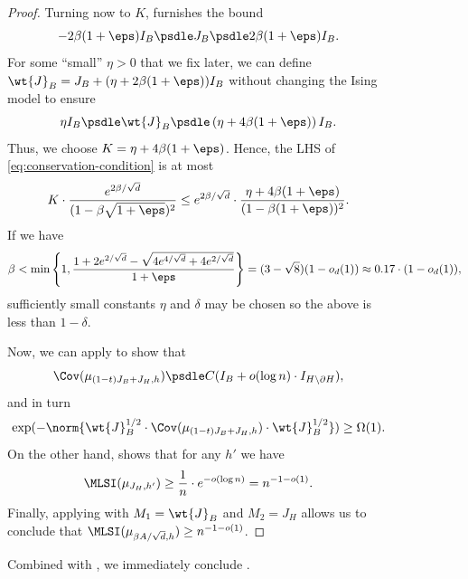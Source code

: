 \documentclass[11pt,letterpaper]{article}
\begin{document}
\begin{figure}
\begin{proof}
        Turning now to $K$,  furnishes the bound
        \[
            -2\beta(1+\eps) I_B \psdle J_B \psdle 2\beta(1+\eps) I_B.
        \]
        For some ``small'' $\eta > 0$ that we fix later, we can define $\wt{J}_B = J_B + (\eta + 2\beta(1+\eps))I_B$ without changing the Ising model to ensure
        \[
            \eta I_B \psdle \wt{J}_B \psdle \left(\eta + 4\beta(1+\eps)\right) I_B.
        \] 
        Thus, we choose $K = \eta + 4\beta(1+\eps)$. Hence, the LHS of \eqref{eq:conservation-condition} is at most
        \begin{align*}
            K \cdot \frac{e^{2\beta/\sqrt{d}}}{(1-\beta\sqrt{1+\eps})^2} \le e^{2\beta/\sqrt{d}} \cdot \frac{\eta + 4\beta(1+\eps)}{(1-\beta(1+\eps))^2}.
        \end{align*}
        If we have
        \begin{align*}
            \beta < \min\left\{ 1 , \frac{1+2e^{2/\sqrt{d}} - \sqrt{4e^{4/\sqrt{d}} + 4e^{2/\sqrt{d}}}}{1+\eps} \right\} = (3-\sqrt{8})(1 - o_d(1)) \approx 0.17 \cdot (1-o_d(1)),
        \end{align*}
        sufficiently small constants $\eta$ and $\delta$ may be chosen so the above is less than $1-\delta$.
    
        Now, we can apply  to show that 
        \[ 
            \Cov(\mu_{(1-t)J_B + J_H,h}) \psdle C (I_B + o(\log n) \cdot I_{H \setminus \partial H}), 
        \]
        and in turn 
        \[
            \exp(-\norm{\wt{J}_B^{1/2} \cdot \Cov(\mu_{(1-t)J_B + J_H,h}) \cdot \wt{J}_B^{1/2}}) \ge \Omega(1).
        \]
        On the other hand,  shows that for any $h'$ we have 
        \[
            \MLSI(\mu_{J_H, h'}) \ge \frac{1}{n} \cdot e^{-o(\log n)} = n^{-1-o(1)}.
        \] 
        Finally, applying  with $M_1 = \wt{J}_B$ and $M_2 = J_H$ allows us to conclude that $\MLSI(\mu_{\beta A/\sqrt{d}, h}) \ge n^{-1 - o(1)}$.
    \end{proof}
    Combined with , we immediately conclude .


\end{figure}
\end{document}

